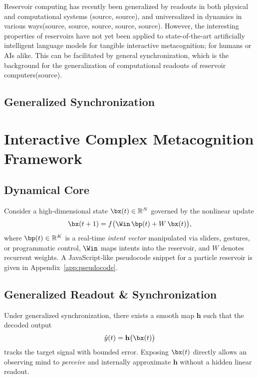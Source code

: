 \documentclass[12pt]{article}
\newcommand{\R}{\mathbb{R}}
\begin{document}
Reservoir computing has recently been generalized by readouts in both physical and computational systems (source, source), and universalized in dynamics in various ways(source, source, source, source, source). However, the interesting properties of reservoirs have not yet been applied to state-of-the-art artificially intelligent language models for tangible interactive metacognition; for humans or AIs alike. This can be facilitated by general synchronization, which is the background for the generalization of computational readouts of reservoir computers(source).

\subsection{Generalized Synchronization}


\section{Interactive Complex Metacognition Framework}
\subsection{Dynamical Core}
Consider a high‑dimensional state $\bx(t)\in\R^{N}$ governed by the nonlinear update
\begin{equation}\label{eq:dynamical-core}
    \bx(t+1) = f\bigl(\Win\,\bp(t) + W\,\bx(t)\bigr),
\end{equation}
where $\bp(t)\in\R^{K}$ is a real‑time \emph{intent vector} manipulated via sliders, gestures, or programmatic control, $\Win$ maps intents into the reservoir, and $W$ denotes recurrent weights. A JavaScript‑like pseudocode snippet for a particle reservoir is given in Appendix~\ref{app:pseudocode}.
\subsection{Generalized Readout \& Synchronization}
Under generalized synchronization, there exists a smooth map $\mathbf{h}$ such that the decoded output
\begin{equation}
    \hat y(t) = \mathbf{h}\bigl(\bx(t)\bigr)
\end{equation}
tracks the target signal with bounded error. Exposing $\bx(t)$ directly allows an observing mind to \emph{perceive} and internally approximate $\mathbf{h}$ without a hidden linear readout.
\end{document}
